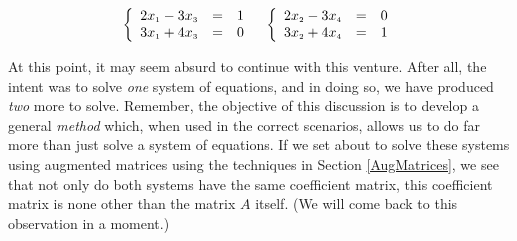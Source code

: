 \[\begin{array}{cc}

\left\{ \begin{array}{rcr} 2x_{\mbox{\tiny$1$}}-3x_{\mbox{\tiny$3$}} & = & 1 \\ 3x_{\mbox{\tiny$1$}}+4x_{\mbox{\tiny$3$}} & = & 0 \\ \end{array} \right.

&

\left\{ \begin{array}{rcr} 2x_{\mbox{\tiny$2$}}-3x_{\mbox{\tiny$4$}} & = & 0 \\ 3x_{\mbox{\tiny$2$}}+4x_{\mbox{\tiny$4$}} & = & 1 \\ \end{array} \right.

\end{array}\]

At this point, it may seem absurd to continue with this venture.  After all, the intent was to solve \textit{one} system of equations, and in doing so, we have produced \textit{two} more to solve.  Remember, the objective of this discussion is to develop a general \textit{method} which, when used in the correct scenarios, allows us to do far more than just solve a system of equations.  If we set about to solve these systems using augmented matrices using the techniques in Section \ref{AugMatrices}, we see that not only do both systems have the same coefficient matrix, this coefficient matrix is none other than the matrix $A$ itself. (We will come back to this observation in a moment.)  


